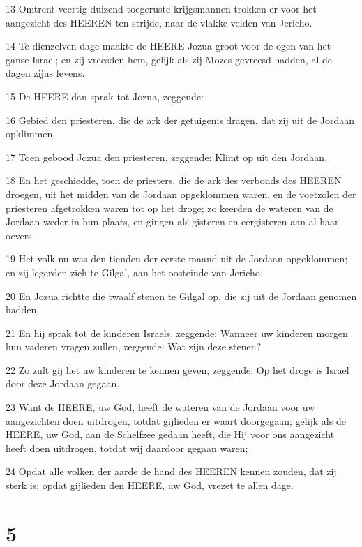 \par 13 Omtrent veertig duizend toegeruste krijgsmannen trokken er voor het aangezicht des HEEREN ten strijde, naar de vlakke velden van Jericho.
\par 14 Te dienzelven dage maakte de HEERE Jozua groot voor de ogen van het ganse Israel; en zij vreesden hem, gelijk als zij Mozes gevreesd hadden, al de dagen zijns levens.
\par 15 De HEERE dan sprak tot Jozua, zeggende:
\par 16 Gebied den priesteren, die de ark der getuigenis dragen, dat zij uit de Jordaan opklimmen.
\par 17 Toen gebood Jozua den priesteren, zeggende: Klimt op uit den Jordaan.
\par 18 En het geschiedde, toen de priesters, die de ark des verbonds des HEEREN droegen, uit het midden van de Jordaan opgeklommen waren, en de voetzolen der priesteren afgetrokken waren tot op het droge; zo keerden de wateren van de Jordaan weder in hun plaats, en gingen als gisteren en eergisteren aan al haar oevers.
\par 19 Het volk nu was den tienden der eerste maand uit de Jordaan opgeklommen; en zij legerden zich te Gilgal, aan het oosteinde van Jericho.
\par 20 En Jozua richtte die twaalf stenen te Gilgal op, die zij uit de Jordaan genomen hadden.
\par 21 En hij sprak tot de kinderen Israels, zeggende: Wanneer uw kinderen morgen hun vaderen vragen zullen, zeggende: Wat zijn deze stenen?
\par 22 Zo zult gij het uw kinderen te kennen geven, zeggende: Op het droge is Israel door deze Jordaan gegaan.
\par 23 Want de HEERE, uw God, heeft de wateren van de Jordaan voor uw aangezichten doen uitdrogen, totdat gijlieden er waart doorgegaan; gelijk als de HEERE, uw God, aan de Schelfzee gedaan heeft, die Hij voor ons aangezicht heeft doen uitdrogen, totdat wij daardoor gegaan waren;
\par 24 Opdat alle volken der aarde de hand des HEEREN kennen zouden, dat zij sterk is; opdat gijlieden den HEERE, uw God, vrezet te allen dage.

\chapter{5}

